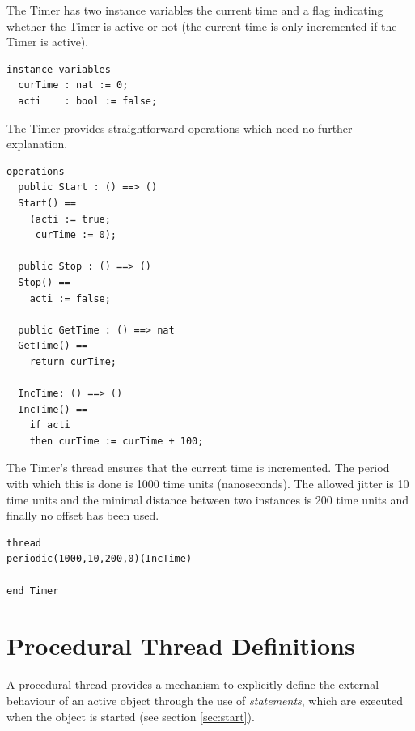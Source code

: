 \documentclass{overturerepchap}
\begin{document}
\begin{description}
The Timer has two instance variables the current time and a flag
indicating whether the Timer is active or not (the current time is
only incremented if the Timer is active).
\begin{lstlisting}
instance variables
  curTime : nat := 0;
  acti    : bool := false;
\end{lstlisting}

The Timer provides straightforward operations which need no further
explanation. 
\begin{lstlisting}
operations
  public Start : () ==> ()
  Start() ==
    (acti := true;
     curTime := 0);

  public Stop : () ==> () 
  Stop() ==
    acti := false;

  public GetTime : () ==> nat
  GetTime() ==
    return curTime;

  IncTime: () ==> ()
  IncTime() ==
    if acti
    then curTime := curTime + 100;
\end{lstlisting}

The Timer's thread ensures that the current time is incremented. The period 
with which this is done is 1000 time units (nanoseconds). The allowed jitter is 10 time units
and the minimal distance between two instances is 200 time units and finally
no offset has been used.

\begin{lstlisting}
thread
periodic(1000,10,200,0)(IncTime)

end Timer
\end{lstlisting}

\end{description}


\section{Procedural Thread Definitions}\label{se:proc-thread}

A procedural thread provides a mechanism to explicitly define the
external behaviour of an active object through the use of {\em
statements}, which are executed when the object is started (see
section \ref{sec:start}).  
\end{document}
